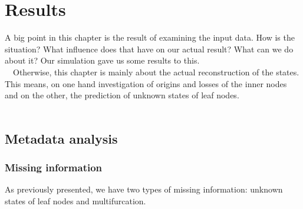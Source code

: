 \chapter{Results}
  A big point in this chapter is the result of examining the input data. How is the situation? What 
    influence does that have on our actual result? What can we do about it? Our simulation gave us 
    some results to this. \\
  Otherwise, this chapter is mainly about the actual reconstruction of the states. This means, on 
    one hand investigation of origins and losses of the inner nodes and on the other, the prediction 
    of unknown states of leaf nodes. \\
   
  \section{Metadata analysis}
    \subsection{Missing information}
      As previously presented, we have two types of missing information: unknown states of leaf nodes 
        and multifurcation. \\

